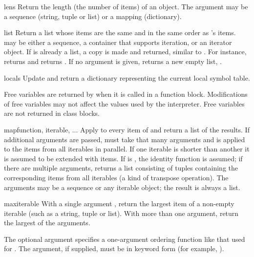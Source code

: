 \begin{funcdesc}{len}{s}
  Return the length (the number of items) of an object.  The argument
  may be a sequence (string, tuple or list) or a mapping (dictionary).
\end{funcdesc}

\begin{funcdesc}{list}{}
  Return a list whose items are the same and in the same order as
  's items.   may be either a sequence, a
  container that supports iteration, or an iterator object.  If
   is already a list, a copy is made and returned,
  similar to .  For instance,
   returns \code{['a', 'b', 'c']} and  returns \code{[1, 2, 3]}.  If no argument is given,
  returns a new empty list, \code{[]}.
\end{funcdesc}

\begin{funcdesc}{locals}{}
  Update and return a dictionary representing the current local symbol table.

  Free variables are returned by  when it is called in
  a function block.  Modifications of free variables may not affect
  the values used by the interpreter.  Free variables are not
  returned in class blocks.
\end{funcdesc}

\begin{funcdesc}{map}{function, iterable, ...}
  Apply  to every item of  and return a list
  of the results.  If additional  arguments are passed,
   must take that many arguments and is applied to the
  items from all iterables in parallel.  If one iterable is shorter than another it
  is assumed to be extended with  items.  If 
  is , the identity function is assumed; if there are
  multiple arguments,  returns a list consisting
  of tuples containing the corresponding items from all iterables (a kind
  of transpose operation).  The  arguments may be a sequence 
  or any iterable object; the result is always a list.
\end{funcdesc}

\begin{funcdesc}{max}{iterable}
  With a single argument , return the largest item of a
  non-empty iterable (such as a string, tuple or list).  With more
  than one argument, return the largest of the arguments.

  The optional  argument specifies a one-argument ordering
  function like that used for .  The 
  argument, if supplied, must be in keyword form (for example,
  ).
\end{funcdesc}

